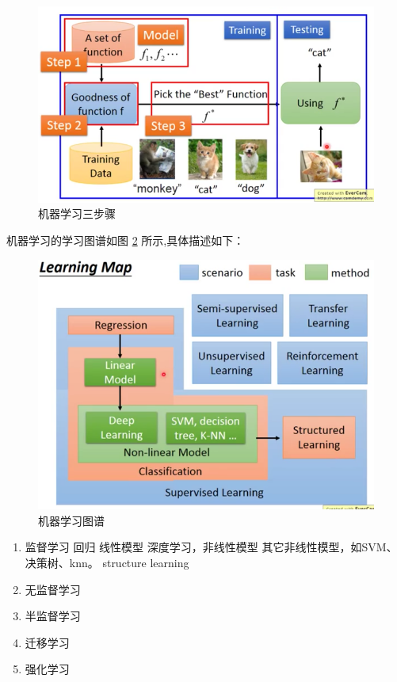 \begin{figure}[ht]
	\centering
	\includegraphics[scale=0.4]{./pic/three_step_of_ml.png}
	\caption{机器学习三步骤}
	\label{fig:three_step}
\end{figure}

机器学习的学习图谱如图 \ref{fig:ml_map} 所示,具体描述如下：

\begin{figure}[ht]
	\centering
	\includegraphics[scale=0.4]{./pic/learning_map.png}
	\caption{机器学习图谱}
	\label{fig:ml_map}
\end{figure}
	
\begin{enumerate}
	\item 监督学习
		\subitem 回归
		\subitem 线性模型
		\subitem 深度学习，非线性模型
		\subitem 其它非线性模型，如SVM、决策树、knn。
		\subitem structure learning
	\item 无监督学习
	\item 半监督学习
	\item 迁移学习
	\item 强化学习

\end{enumerate}

